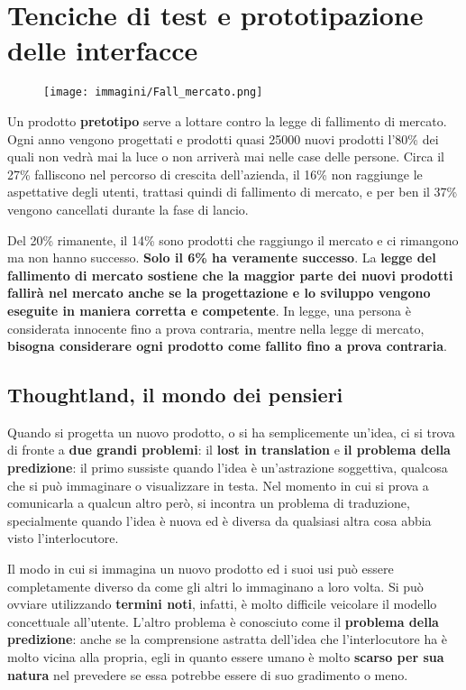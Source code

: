 
\chapter{Tenciche di test e prototipazione delle interfacce}
\begin{figure}[!h]
	\centering
	\texttt{[image: immagini/Fall\_mercato.png]}
\end{figure}


Un prodotto \textbf{pretotipo} serve a lottare contro la legge di fallimento di mercato. Ogni anno vengono progettati e prodotti quasi 25000 nuovi prodotti l'80\% dei quali non vedrà mai la luce o non arriverà mai nelle case delle persone. Circa il 27\%
falliscono nel percorso di crescita dell'azienda, il 16\% non raggiunge le aspettative degli utenti, trattasi quindi di fallimento di mercato, e per ben il 37\% vengono cancellati durante la fase di lancio.

Del 20\% rimanente, il 14\% sono prodotti che raggiungo il mercato e ci rimangono ma
non hanno successo. \textbf{Solo il 6\% ha veramente successo}. La
\textbf{legge del fallimento di mercato sostiene che la maggior parte dei nuovi prodotti fallirà nel mercato anche se la progettazione e lo sviluppo vengono eseguite in maniera corretta e competente}.
In legge, una persona è considerata innocente fino a prova contraria, mentre nella legge di mercato, \textbf{bisogna considerare ogni prodotto come fallito fino a prova contraria}.

\section{Thoughtland, il mondo dei pensieri}
Quando si progetta un nuovo prodotto, o si ha semplicemente un'idea, ci si trova di fronte a \textbf{due grandi problemi}: il \textbf{lost in translation} e \textbf{il problema della predizione}: il primo sussiste quando l'idea è un'astrazione soggettiva, qualcosa che si può immaginare o visualizzare in testa. Nel momento in cui si prova a comunicarla a qualcun altro però, si incontra un problema
di traduzione, specialmente quando l'idea è nuova ed è diversa da qualsiasi altra cosa
abbia visto l'interlocutore.

Il modo in cui si immagina un nuovo prodotto ed i suoi usi può essere completamente diverso da come gli altri lo immaginano a loro volta. Si può ovviare utilizzando \textbf{termini noti}, infatti, è molto difficile veicolare il modello concettuale all'utente. L'altro problema è conosciuto come il \textbf{problema della predizione}: anche se la comprensione astratta dell'idea che l'interlocutore ha è molto vicina alla propria, egli in quanto essere umano è molto \textbf{scarso per sua natura} nel prevedere se essa potrebbe essere di suo gradimento o meno.

